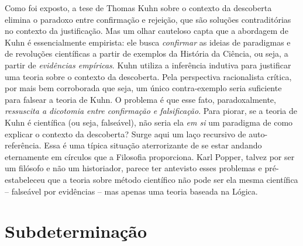 \documentclass[./main.tex]{subfiles}
\begin{document}
\par Como foi exposto, a tese de Thomas Kuhn sobre o contexto da descoberta elimina o paradoxo entre confirmação e rejeição, que são soluções contraditórias no contexto da justificação. Mas um olhar cauteloso capta que a abordagem de Kuhn é essencialmente empirista: ele busca \textit{confirmar} as ideias de paradigmas e de revoluções científicas a partir de exemplos da História da Ciência, ou seja, a partir de \textit{evidências empíricas}. Kuhn utiliza a inferência indutiva para justificar uma teoria sobre o contexto da descoberta. Pela perspectiva racionalista crítica, por mais bem corroborada que seja, um único contra-exemplo seria suficiente para falsear a teoria de Kuhn. O problema é que esse fato, paradoxalmente, \textit{ressuscita a dicotomia entre confirmação e falsificação}. Para piorar, se a teoria de Kuhn é científica (ou seja, falseável), não seria ela \textit{em si} um paradigma de como explicar o contexto da descoberta? Surge aqui um laço recursivo de auto-referência. Essa é uma típica situação aterrorizante de se estar andando eternamente em círculos que a Filosofia proporciona. Karl Popper, talvez por ser um filósofo e não um historiador, parece ter antevisto esses problemas e pré-estabeleceu que a teoria sobre método científico não pode ser ela mesma científica -- falseável por evidências -- mas apenas uma teoria baseada na Lógica.

\section{Subdeterminação} \label{sec:epis:under}
\end{document}

